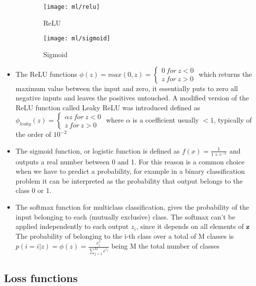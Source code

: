 \documentclass[a4paper,11pt]{article}
\begin{document}
\begin{figure}[h!]
\centering
\begin{subfigure}{0.3\textwidth}
\texttt{[image: ml/relu]}
\caption{ReLU}
\label{}
\end{subfigure}
\begin{subfigure}{0.3\textwidth}
\texttt{[image: ml/sigmoid]}
\caption{Sigmoid}
\label{}
\end{subfigure}
\caption{}
\label{}
\end{figure}




\begin{itemize}

\item The ReLU functions $\phi(z) = max(0, z) = \begin{cases} 0 \ for \ z<0 \\ z \ for \ z>0 \end{cases}$ which returns the maximum value between the input and zero, it essentially puts to zero all negative inputs and leaves the positives untouched.
A modified version of the ReLU function called Leaky ReLU was introduced defined as
$\phi_{leaky}(z) = \begin{cases} \alpha z \ for \ z<0 \\ z \ for \ z>0 \end{cases}$ where $\alpha$ is a coefficient usually $< 1$, typically of the order of $10^{-2}$


\item The sigmoid function, or logistic function is defined as $f(x) = \frac{1}{1+e^{-x}}$ and outputs a real number between 0 and 1. For this reason is a common choice when we have to predict a probability, for example in a binary classification problem it can be interpreted as the probability that output belongs to the class 0 or 1.


\item The softmax function for multiclass classification, gives the probability of the input belonging to each (mutually exclusive) class. The softmax can't be applied independently to each output $z_i$, since it depends on all elements of $\textbf{z}$ The probability of belonging to the i-th class over a total of M classes is
$p(i = i|z) = \phi(z) = \frac{e^z_i}{\sum_{j = 1}^M e^{z_j}}$ being M the total number of classes
\end{itemize}


\subsection{Loss functions}
\end{document}
